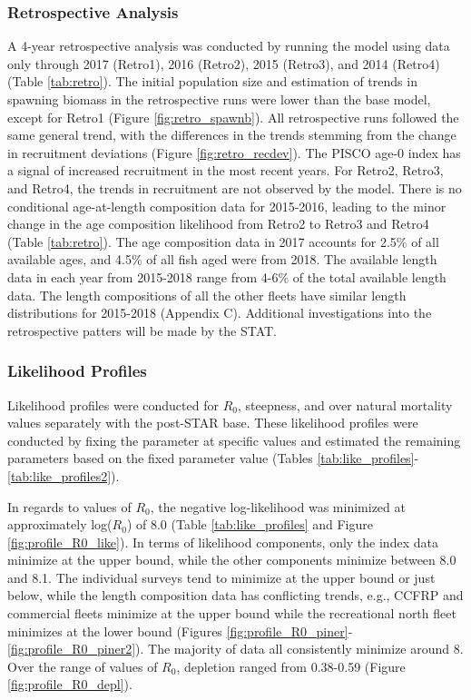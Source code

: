 \documentclass[12pt,]{article}
\begin{document}
\subsubsection{Retrospective Analysis}\label{retrospective-analysis}

A 4-year retrospective analysis was conducted by running the model using
data only through 2017 (Retro1), 2016 (Retro2), 2015 (Retro3), and 2014
(Retro4) (Table \ref{tab:retro}). The initial population size and
estimation of trends in spawning biomass in the retrospective runs were
lower than the base model, except for Retro1 (Figure
\ref{fig:retro_spawnb}). All retrospective runs followed the same
general trend, with the differences in the trends stemming from the
change in recruitment deviations (Figure \ref{fig:retro_recdev}). The
PISCO age-0 index has a signal of increased recruitment in the most
recent years. For Retro2, Retro3, and Retro4, the trends in recruitment
are not observed by the model. There is no conditional age-at-length
composition data for 2015-2016, leading to the minor change in the age
composition likelihood from Retro2 to Retro3 and Retro4 (Table
\ref{tab:retro}). The age composition data in 2017 accounts for 2.5\% of
all available ages, and 4.5\% of all fish aged were from 2018. The
available length data in each year from 2015-2018 range from 4-6\% of
the total available length data. The length compositions of all the
other fleets have similar length distributions for 2015-2018 (Appendix
C). Additional investigations into the retrospective patters will be
made by the STAT.

\subsubsection{Likelihood Profiles}\label{likelihood-profiles}

Likelihood profiles were conducted for \(R_0\), steepness, and over
natural mortality values separately with the post-STAR base. These
likelihood profiles were conducted by fixing the parameter at specific
values and estimated the remaining parameters based on the fixed
parameter value (Tables
\ref{tab:like_profiles}-\ref{tab:like_profiles2}).

In regards to values of \(R_0\), the negative log-likelihood was
minimized at approximately log(\(R_0\)) of 8.0 (Table
\ref{tab:like_profiles} and Figure \ref{fig:profile_R0_like}). In terms
of likelihood components, only the index data minimize at the upper
bound, while the other components minimize between 8.0 and 8.1. The
individual surveys tend to minimize at the upper bound or just below,
while the length composition data has conflicting trends, e.g., CCFRP
and commercial fleets minimize at the upper bound while the recreational
north fleet minimizes at the lower bound (Figures
\ref{fig:profile_R0_piner}-\ref{fig:profile_R0_piner2}). The majority of
data all consistently minimize around 8. Over the range of values of
\(R_0\), depletion ranged from 0.38-0.59 (Figure
\ref{fig:profile_R0_depl}).
\end{document}
